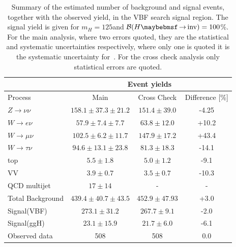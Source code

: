 \begin{table}[!htb]
\centering
\begin{tabular}{|l|c|c|c|}
\hline 
        & \multicolumn{3}{c|}{Event yields} \\
\hline
Process               & Main                      & Cross Check       & Difference [\%] \\
\hline\hline
$Z\rightarrow\nu\nu$  & $158.1 \pm 37.3 \pm 21.2$ & $151.4 \pm 39.0$  &           -4.25 \\
$W\rightarrow e\nu$   & $ 57.9 \pm 7.4  \pm  7.7$ &  $63.8 \pm 12.0$  &           +10.2 \\
$W\rightarrow\mu\nu$  & $102.5 \pm 6.2  \pm 11.7$ & $147.9 \pm 17.2$  &           +43.4 \\
$W\rightarrow\tau\nu$ & $ 94.6 \pm 13.1 \pm 23.8$ &  $81.3 \pm 18.3$  &           -14.1 \\
top                   & $  5.5 \pm 1.8$           &   $5.0 \pm 1.2$   &            -9.1 \\ 
VV                    & $  3.9 \pm 0.7$           &   $3.5 \pm 0.7$   &           -10.3 \\  
QCD multijet          & $   17 \pm 14$            &                -  &               - \\
\hline\hline                                                     
Total Background      & $439.4 \pm 40.7 \pm 43.5$ &   $452.9\pm47.93$ &            +3.0 \\
\hline\hline                                                     
Signal(VBF)           & $273.1 \pm 31.2 $         &   $267.7 \pm 9.1$ &            -2.0 \\
Signal(ggH)           & $ 23.1 \pm 15.9 $         &   $ 21.7 \pm 6.0$ &            -6.1 \\
\hline\hline                                                     
Observed data         & 508                       &               508 &             0.0 \\
\hline
\end{tabular}
\caption{Summary of the estimated number of background and signal events, together with the observed yield, in the \gls{VBF} search signal region. The signal yield is given for $m_H=125$\GeV and $\BRinv=100$\%. For the main analysis, where two errors quoted, they are the statistical and systematic uncertainties respectively, where only one is quoted it is the systematic uncertainty for~\cite{ARTICLE:CMSVBFHiggsInvisibleParkedAnalysisPAS}. For the cross check analysis only statistical errors are quoted.}
\label{TABLE:ParkedDataAnalysis_Results_Summary}
\end{table}


